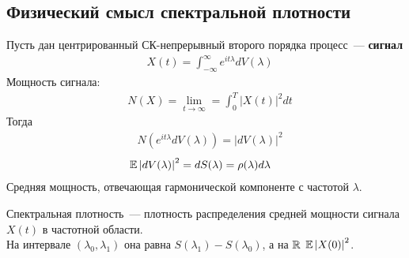 \subsection{Физический смысл спектральной плотности}
Пусть дан центрированный СК-непрерывный второго порядка процесс~---
\textbf{сигнал}
\begin{align*}
  & X(t) = \int_{-\infty}^{\infty}e^{it\lambda}dV(\lambda)
\end{align*}
Мощность сигнала:
\begin{align*}
  & N(X) = \lim_{t \to \infty} = \int_{0}^{T}\left| X(t) \right|^2 dt
\end{align*}
Тогда
\begin{align*}
  & N\left( e^{it\lambda}dV(\lambda) \right) = \left| dV(\lambda) \right|^2
\end{align*}
\begin{align*}
  & \mathbb{E}\left| dV(\lambda) \right|^2 = dS(\lambda) = \rho(\lambda)d\lambda
\end{align*}
Средняя мощность, отвечающая гармонической компоненте с частотой $\lambda$.
\begin{Note}
    Спектральная плотность~--- плотность распределения средней мощности сигнала
    $X(t)$ в частотной области.
    \\
    На интервале $(\lambda_0, \lambda_1)$ она равна $S(\lambda_1)-S(\lambda_0)$,
    а на $\mathbb{R}$ $\mathbb{E} \left| X(0) \right|^2$.
\end{Note}
